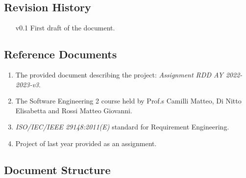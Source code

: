\documentclass[11pt]{article}
\begin{document}
\subsection{Revision History}

\begin{enumerate}
    \item[v0.1] First draft of the document.
\end{enumerate}

\subsection{Reference Documents}

\begin{enumerate}
    \item The provided document describing the project: \textit{Assignment RDD AY 2022-2023-v3}.
    \item The Software Engineering 2 course held by Prof.s Camilli Matteo, Di Nitto Elisabetta and Rossi Matteo Giovanni.
    \item \textit{ISO/IEC/IEEE 29148:2011(E)} standard for Requirement Engineering.
    \item Project of last year provided as an assignment.
\end{enumerate}

\subsection{Document Structure}
\end{document}
